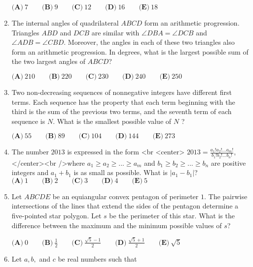 \documentclass{article}
\begin{document}
\begin{enumerate}[label=\arabic*., itemsep=0.5em]
\(\textbf{(A)}\ 7 \qquad \textbf{(B)}\ 9 \qquad \textbf{(C)}\ 12 \qquad \textbf{(D)}\ 16 \qquad \textbf{(E)}\ 18\)\par \vspace{0.5em}\item The internal angles of quadrilateral \(ABCD\) form an arithmetic progression. Triangles \(ABD\) and \(DCB\) are similar with \(\angle DBA = \angle DCB\) and \(\angle ADB = \angle CBD\). Moreover, the angles in each of these two triangles also form an arithmetic progression. In degrees, what is the largest possible sum of the two largest angles of \(ABCD\)?

\(\textbf{(A)}\ 210 \qquad \textbf{(B)}\ 220 \qquad \textbf{(C)}\ 230 \qquad \textbf{(D)}\ 240 \qquad \textbf{(E)}\ 250\)\par \vspace{0.5em}\item Two non-decreasing sequences of nonnegative integers have different first terms. Each sequence has the property that each term beginning with the third is the sum of the previous two terms, and the seventh term of each sequence is \(N\). What is the smallest possible value of \(N\) ?

\(\textbf{(A)}\ 55 \qquad \textbf{(B)}\ 89 \qquad \textbf{(C)}\ 104 \qquad \textbf{(D)}\ 144 \qquad \textbf{(E)}\ 273\)\par \vspace{0.5em}\item The number \(2013\) is expressed in the form <br \> <center> \(2013 = \frac {a_1!a_2!...a_m!}{b_1!b_2!...b_n!}\),</center><br />where \(a_1 \ge a_2 \ge ... \ge a_m\) and \(b_1 \ge b_2 \ge ... \ge b_n\) are positive integers and \(a_1 + b_1\) is as small as possible. What is \(|a_1 - b_1|\)?
\(\textbf{(A)}\ 1 \qquad \textbf{(B)}\ 2 \qquad \textbf{(C)}\ 3 \qquad \textbf{(D)}\ 4 \qquad \textbf{(E)}\ 5\)\par \vspace{0.5em}\item Let \(ABCDE\) be an equiangular convex pentagon of perimeter \(1\). The pairwise intersections of the lines that extend the sides of the pentagon determine a five-pointed star polygon. Let \(s\) be the perimeter of this star. What is the difference between the maximum and the minimum possible values of \(s\)?

\(\textbf{(A)}\ 0 \qquad \textbf{(B)}\ \frac{1}{2} \qquad \textbf{(C)}\ \frac{\sqrt{5}-1}{2} \qquad \textbf{(D)}\  \frac{\sqrt{5}+1}{2} \qquad \textbf{(E)}\ \sqrt{5}\)\par \vspace{0.5em}\item Let \(a,b,\) and \(c\) be real numbers such that 



\end{enumerate}
\end{document}
